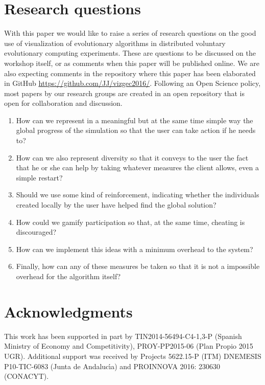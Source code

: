 \documentclass{sig-alternate}
\begin{document}
\section{Research questions}

With this paper we would like to raise a series of research questions
on the good use of visualization of evolutionary algorithms in
distributed voluntary evolutionary computing experiments. These are
questions to be discussed on the workshop itself, or as comments when
this paper will be published online. We are also expecting comments in
the repository where this paper has been elaborated in GitHub
\url{https://github.com/JJ/vizgec2016/}. Following an Open Science
policy, most papers by our research groups are created in an open
repository that is open for collaboration and discussion.

\begin{enumerate}
\item How can we represent in a meaningful but at the same time simple
  way the global progress of the simulation so that the user can take
  action if he needs to?
\item How can we also represent diversity so that it conveys to the
  user the fact that he or she can help by taking whatever measures
  the client allows, even a simple restart?
\item Should we use some kind of reinforcement, indicating whether the
  individuals created locally by the user have helped find the global solution?
\item How could we gamify participation so that, at the same time,
  cheating is discouraged?
\item How can we implement this ideas with a minimum overhead to the system?  
\item Finally, how can any of these measures be taken so that it is
  not a impossible overhead for the algorithm itself?
\end{enumerate}

\section*{Acknowledgments}
 
This work has been supported in part by
TIN2014-56494-C4-{1,3}-P (Spanish Ministry of Economy and
Competitivity), PROY-PP2015-06 (Plan Propio 2015 UGR). Additional
support was received by 
Projects 5622.15-P (ITM) DNEMESIS P10-TIC-6083 (Junta de
Andaluc\'{\i}a) and PROINNOVA 2016: 230630 (CONACYT). 



\end{document}
